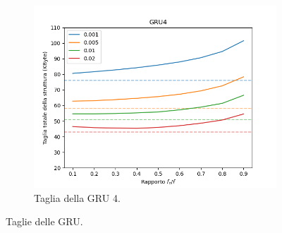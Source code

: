 \documentclass[../../main.tex]{subfiles}
\begin{document}
\begin{figure}[H]
        \begin{subfigure}[b]{0.32\textwidth}
            \centering
            \includegraphics[width = \textwidth]{immagini/7/LBF/GRU4_Taglia.png}
            \caption{Taglia della GRU 4.}
            \label{fig:LBFTagliaGRU4}
        \end{subfigure}
        \caption{Taglie delle GRU.}
        \label{fig:taglieGRULBF}
    \end{figure}
\end{document}
